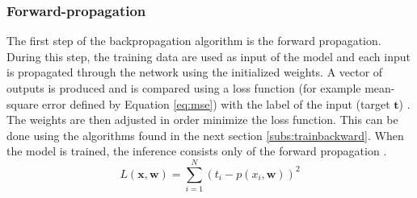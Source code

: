 \subsubsection{Forward-propagation} \label{subs:trainforward}
%
The first step of the backpropagation algorithm is the forward propagation. During this step, the training data are used as input of the model and each input is propagated through the network using the initialized weights. A vector of outputs is produced and is compared using a loss function (for example mean-square error defined by Equation \eqref{eq:mse}) with the label of the input (target $\boldsymbol{t}$) \cite{matteucci_artificial_2019}. The weights are then adjusted in order minimize the loss function. This can be done using the algorithms found in the next section \ref{subs:trainbackward}. When the model is trained, the inference consists only of the forward propagation \cite{abdelouahab_accelerating_2018}.
%
\begin{equation}
    L(\boldsymbol{x}, \boldsymbol{w}) = \sum^{N}_{i=1} (t_i - p(x_i, \boldsymbol{w}))^2
    \label{eq:mse}
\end{equation}
